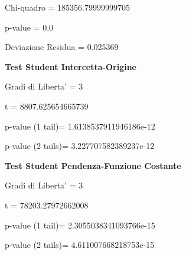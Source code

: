 \documentclass{article}
\begin{document}
Chi-quadro = 185356.79999999705

p-value = 0.0

Deviazione Residua = 0.025369

\textbf{Test Student Intercetta-Origine}

Gradi di Liberta' = 3

t = 8807.625654665739

p-value (1 tail)= 1.6138537911946186e-12

p-value (2 tails)= 3.227707582389237e-12

\textbf{Test Student Pendenza-Funzione Costante}

Gradi di Liberta' = 3

t = 78203.27972662008

p-value (1 tail)= 2.3055038341093766e-15

p-value (2 tails)= 4.611007668218753e-15
\end{document}
